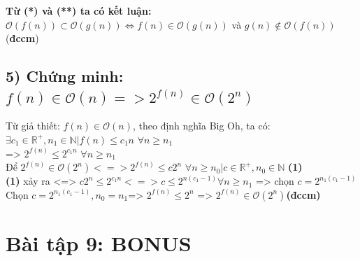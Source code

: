 \documentclass[10pt,a4paper]{article}
\begin{document}
\textbf{Từ (*) và (**) ta có kết luận: }\\$\mathcal{O}(f(n)) \subset \mathcal{O}(g(n)) \Leftrightarrow f(n) \in \mathcal{O}(g(n))$ và $g(n) \notin \mathcal{O}(f(n))$ (\textbf{đccm})
\subsection*{5) Chứng minh: $f(n) \in\mathcal{O}(n) => 2^{f(n)} \in \mathcal{O}(2^n)$}
Từ giả thiết: $f(n) \in \mathcal{O}(n)$, theo định nghĩa Big Oh, ta có: \\
$\exists c_1 \in \mathbb{R^+},n_1 \in \mathbb{N} | f(n) \leq c_1n$ $\forall n \geq n_1$\\
=> $2^{f(n)} \leq 2^{c_1n}$ $\forall n \geq n_1$ \\
Để $2^{f(n)} \in \mathcal{O}(2^n) <=> 2^{f(n)} \leq c2^n$ $\forall n \geq n_0 | c \in \mathbb{R^+},n_0 \in \mathbb{N}$ \textbf{(1)}\\
\textbf{(1)} xảy ra <=> $c2^n \leq 2^{c_1n} <=> c \leq 2^{n(c_1-1)} $$\forall n \geq n_1$ => chọn $c = 2^{n_1(c_1-1)}$\\ 
Chọn $c = 2^{n_1(c_1-1)},n_0 = n_1$=> $2^{f(n)} \leq 2^n$ => $2^{f(n)} \in \mathcal{O}(2^n)$\textbf{(đccm)}
\section*{Bài tập 9: BONUS } 
\end{document}
